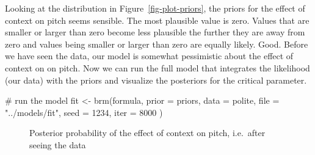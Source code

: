\documentclass[
  doc,
  floatsintext,
  longtable,
  nolmodern,
  notxfonts,
  notimes,
  colorlinks=true,linkcolor=blue,citecolor=blue,urlcolor=blue]{apa7}
\newenvironment{Shaded}{\begin{snugshade}}{\end{snugshade}}
\newcommand{\AttributeTok}[1]{\textcolor[rgb]{0.40,0.45,0.13}{#1}}
\newcommand{\CommentTok}[1]{\textcolor[rgb]{0.37,0.37,0.37}{#1}}
\newcommand{\DecValTok}[1]{\textcolor[rgb]{0.68,0.00,0.00}{#1}}
\newcommand{\FunctionTok}[1]{\textcolor[rgb]{0.28,0.35,0.67}{#1}}
\newcommand{\NormalTok}[1]{\textcolor[rgb]{0.00,0.23,0.31}{#1}}
\newcommand{\OtherTok}[1]{\textcolor[rgb]{0.00,0.23,0.31}{#1}}
\newcommand{\StringTok}[1]{\textcolor[rgb]{0.13,0.47,0.30}{#1}}
\begin{document}
Looking at the distribution in Figure~\ref{fig-plot-priors}, the priors
for the effect of context on pitch seems sensible. The most plausible
value is zero. Values that are smaller or larger than zero become less
plausible the further they are away from zero and values being smaller
or larger than zero are equally likely. Good. Before we have seen the
data, our model is somewhat pessimistic about the effect of context on
on pitch. Now we can run the full model that integrates the likelihood
(our data) with the priors and visualize the posteriors for the critical
parameter.

\begin{Shaded}
\begin{Highlighting}[]
\CommentTok{\# run the model}
\NormalTok{fit }\OtherTok{\textless{}{-}} \FunctionTok{brm}\NormalTok{(formula, }\AttributeTok{prior =}\NormalTok{ priors, }\AttributeTok{data =}\NormalTok{ polite,}
           \AttributeTok{file  =} \StringTok{"../models/fit"}\NormalTok{,}
           \AttributeTok{seed =} \DecValTok{1234}\NormalTok{, }\AttributeTok{iter =} \DecValTok{8000}
\NormalTok{           )}
\end{Highlighting}
\end{Shaded}

\begin{figure}[!tbp]

\caption{\label{fig-plot-posterior}Posterior probability of the effect
of context on pitch, i.e.~after seeing the data}


\end{figure}%
\end{document}
